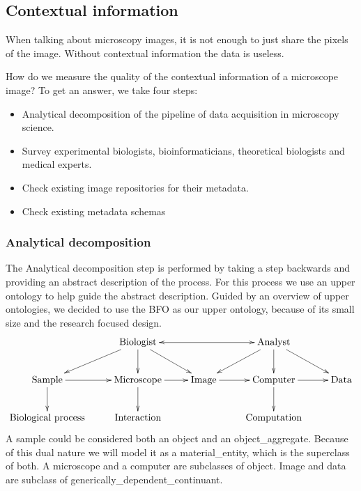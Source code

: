 \subsection{Contextual information}

When talking about microscopy images, it is
not enough to just share the pixels of the
image. Without contextual
information the data is useless.

How do we measure the quality of the contextual information of a
microscope image? To get an answer, we take four steps:
\begin{itemize}
\item Analytical decomposition of the
  pipeline of data acquisition
  in microscopy science.
\item Survey experimental biologists, bioinformaticians, theoretical
  biologists and medical experts.
\item Check existing image repositories for
  their metadata.
\item Check existing metadata schemas
\end{itemize}

\subsubsection{Analytical decomposition}

The Analytical decomposition
step is performed by taking a
step backwards and providing an abstract description of the
process. For this process we use an upper
ontology
to help guide the abstract description. Guided by an overview of upper
ontologies\cite{mascardi2007comparison}, we decided to use the
BFO\cite{grenon2004biodynamic} as our upper ontology, because of its
small size and the research focused design.
\begin{displaymath}
  \xymatrix{ & \text{Biologist} \ar[dl] \ar[d] \ar[dr] \ar@{<->}[rr] &
    & \text{Analyst} \ar[dl] \ar[d] \ar[dr] & \\ \text{Sample} \ar[d]
    \ar[r] & \text{Microscope} \ar[d] \ar[r] & \text{Image} \ar[r] &
    \text{Computer} \ar[d] \ar[r] & \text{Data} \\ \text{Biological
      process} & \text{Interaction} & & \text{Computation} & }
\end{displaymath}
A sample could be considered both an
object and an
object\_aggregate. Because of this dual nature
we will model it as a material\_entity, which
is the superclass of both. A microscope and a
computer are subclasses of
object. Image and data are
subclass of
generically\_dependent\_continuant.

